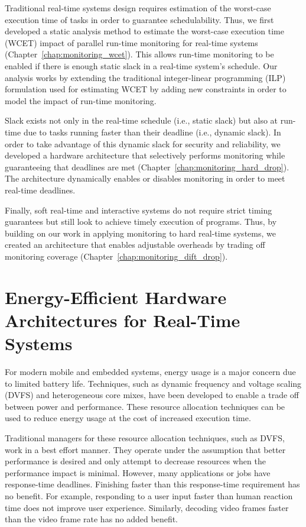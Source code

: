 Traditional real-time systems design requires estimation of the worst-case
execution time of tasks in order to guarantee schedulability. Thus, we first
developed a static analysis method to estimate the worst-case execution time
(WCET) impact of parallel run-time monitoring for real-time systems
(Chapter~\ref{chap:monitoring_wcet}). This allows run-time monitoring to be
enabled if there is enough static slack in a real-time system's schedule.
Our analysis works by extending the traditional integer-linear programming
(ILP) formulation used for estimating WCET by adding new constraints in order
to model the impact of run-time monitoring.

Slack exists not only in the real-time schedule (i.e., static slack) but also
at run-time due to tasks running faster than their deadline (i.e., dynamic
slack). In order to take advantage of this dynamic slack for security and
reliability, we developed a hardware architecture that selectively performs
monitoring while guaranteeing that deadlines are met
(Chapter~\ref{chap:monitoring_hard_drop}). The architecture dynamically enables
or disables monitoring in order to meet real-time deadlines.

Finally, soft real-time and interactive systems do not require strict timing guarantees
but still look to achieve timely execution of programs. Thus, by building on
our work in applying monitoring to hard real-time systems, we created an
architecture that enables adjustable overheads by trading off monitoring coverage
(Chapter~\ref{chap:monitoring_dift_drop}). 

\section{Energy-Efficient Hardware Architectures for Real-Time Systems}
\label{sec:intro.energy}

For modern mobile and embedded systems, energy usage is a major concern due to
limited battery life. Techniques, such as dynamic frequency and voltage scaling
(DVFS) and heterogeneous core mixes, have been developed to enable a trade off
between power and performance. These resource allocation techniques can be used
to reduce energy usage at the cost of increased execution time.

Traditional managers for these resource allocation techniques, such as DVFS,
work in a best effort manner. They operate under the assumption that better
performance is desired and only attempt to decrease resources when the
performance impact is minimal.  However, many applications or jobs have
response-time deadlines. Finishing faster than this response-time
requirement has no benefit. For example, responding to a user input faster than
human reaction time does not improve user experience. Similarly, decoding video
frames faster than the video frame rate has no added benefit. 


